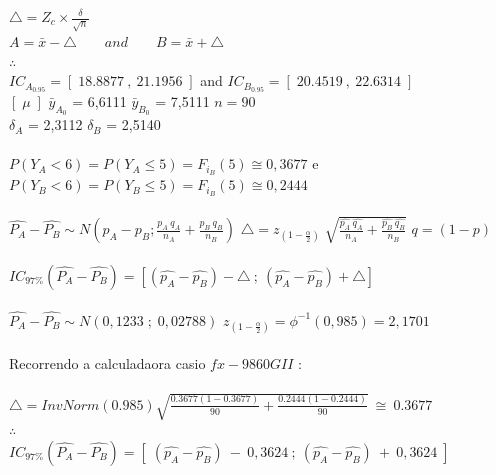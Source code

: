 $\triangle=Z_c\times\frac{\delta}{\sqrt{n}}$ \\
$A = \bar{x}-\triangle \qquad and \qquad B = \bar{x}+\triangle$ \\
$\therefore$\\
$IC_{A_{0.95}}=\left[ \; 18.8877 \: , \: 21.1956 \; \right]$ \hspace{1cm} and \hspace{1cm} $IC_{B_{0.95}}=\left[ \; 20.4519 \: , \: 22.6314 \; \right]$\\
$\left[ \; \mu \; \right]$
$\bar{y}_{A_0}$ = 6,6111 \qquad $\bar{y}_{B_0}$ = 7,5111 \qquad $n=90$ \\
$\delta_A$ = 2,3112 \qquad $\delta_B$ = 2,5140 \\
\\
$P(Y_A < 6)=P(Y_A \leqslant 5)=F_{i_B}(5) \cong 0,3677 $  \quad e \quad $P(Y_B < 6)=P(Y_B \leqslant 5)=F_{i_B}(5) \cong 0,2444$ \\
\\
$\hat{P_A}-\hat{P_B} \sim N \left( p_A - p_B ; \frac{p_A\:q_A}{n_A} + \frac{p_B\:q_B}{n_B}\right)$ \hspace{1cm}
$\triangle=z_{(1-\frac{\alpha}{2})} \;\sqrt{\frac{\hat{p_A} \: \hat{q_A}}{n_A}+\frac{\hat{p_B} \: \hat{q_B}}{n_B}}$ \hspace{1cm} $q=(1-p)$ \\
\\
$IC_{97\%}(\hat{P_A}-\hat{P_B})=\left[(\hat{p_A}-\hat{p_B})-\triangle \: ; \: (\hat{p_A}-\hat{p_B})+\triangle \right]$ \\
\\
$\hat{P_A}-\hat{P_B} \sim N \left( 0,1233 \; ; \; 0,02788\right)$ \hspace{1cm}
$z_{(1-\frac{\alpha}{2})}=\phi^{-1}(0,985)=2,1701$ \\
\\
Recorrendo a calculadaora casio $fx-9860GII$ : \\
\\
$\triangle= InvNorm(0.985)\sqrt{\frac{0.3677(1-0.3677)}{90}+\frac{0.2444(1-0.2444)}{90}}\: \cong \:0.3677$
\\
$\therefore$
\\
$IC_{97\%}(\hat{P_A}-\hat{P_B})=\left[ \; (\hat{p_A}-\hat{p_B}) \:-\: 0,3624 \: ; \: (\hat{p_A}-\hat{p_B}) \:+\: 0,3624 \; \right]$ \\
\\
